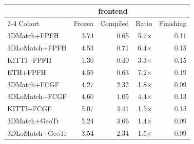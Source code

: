 \begin{tabular}{lrrrr}
\toprule
 & \multicolumn{3}{c}{\ls{} frontend} & \\
\cmidrule(lr){2-4}
Cohort & Frozen & Compiled & Ratio & Finishing \\
\midrule
3DMatch+FPFH & 3.74 & 0.65 & 5.7$\times$ & 0.11 \\
3DLoMatch+FPFH & 4.53 & 0.71 & 6.4$\times$ & 0.15 \\
KITTI+FPFH & 1.30 & 0.40 & 3.3$\times$ & 0.15 \\
ETH+FPFH & 4.59 & 0.63 & 7.2$\times$ & 0.19 \\
\midrule
3DMatch+FCGF & 4.27 & 2.32 & 1.8$\times$ & 0.09 \\
3DLoMatch+FCGF & 4.60 & 1.05 & 4.4$\times$ & 0.13 \\
KITTI+FCGF & 5.07 & 3.41 & 1.5$\times$ & 0.15 \\
3DMatch+GeoTr & 5.24 & 3.66 & 1.4$\times$ & 0.09 \\
3DLoMatch+GeoTr & 3.54 & 2.34 & 1.5$\times$ & 0.09 \\
\bottomrule
\end{tabular}
